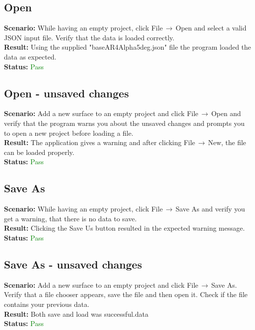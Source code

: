\documentclass[a4paper, 11pt, article]{report}
\begin{document}
\subsection{Open}

\noindent \textbf{Scenario:} While having an empty project, click File$\,\to\,$Open and select a valid JSON input file. Verify that the data is loaded correctly.
\\
\noindent \textbf{Result:} Using the supplied "baseAR4Alpha5deg.json" file the program loaded the data as expected.
\\
\noindent \textbf{Status:} \textcolor{green}{Pass}

\subsection{Open - unsaved changes}

\noindent \textbf{Scenario:} Add a new surface to an empty project and click File$\,\to\,$Open and verify that the program warns you about the unsaved changes and prompts you to open a new project before loading a file.
\\
\noindent \textbf{Result:} The application gives a warning and after clicking File$\,\to\,$New, the file can be loaded properly.
\\
\noindent \textbf{Status:} \textcolor{green}{Pass}

\subsection{Save As}

\noindent \textbf{Scenario:} While having an empty project, click File$\,\to\,$Save As and verify you get a warning, that there is no data to save.
\\
\noindent \textbf{Result:} Clicking the Save Us button resulted in the expected warning message.
\\
\noindent \textbf{Status:} \textcolor{green}{Pass}

\subsection{Save As - unsaved changes}

\noindent \textbf{Scenario:} Add a new surface to an empty project and click File$\,\to\,$Save As. Verify that a file chooser appears, save the file and then open it. Check if the file contains your previous data.
\\
\noindent \textbf{Result:} Both save and load was successful.data
\\
\noindent \textbf{Status:} \textcolor{green}{Pass}
\end{document}
